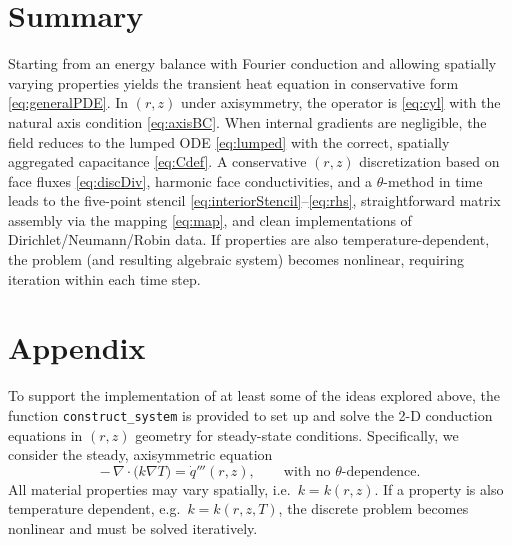 \documentclass[11pt]{article}
\begin{document}
\section{Summary}

Starting from an energy balance with Fourier conduction and allowing spatially varying properties yields the transient heat equation in conservative form \eqref{eq:generalPDE}. In $(r,z)$ under axisymmetry, the operator is \eqref{eq:cyl} with the natural axis condition \eqref{eq:axisBC}. When internal gradients are negligible, the field reduces to the lumped ODE \eqref{eq:lumped} with the correct, spatially aggregated capacitance \eqref{eq:Cdef}. A conservative $(r,z)$ discretization based on face fluxes \eqref{eq:discDiv}, harmonic face conductivities, and a $\theta$-method in time leads to the five-point stencil \eqref{eq:interiorStencil}--\eqref{eq:rhs}, straightforward matrix assembly via the mapping \eqref{eq:map}, and clean implementations of Dirichlet/Neumann/Robin data. If properties are also temperature-dependent, the problem (and resulting algebraic system) becomes nonlinear, requiring iteration within each time step.

\section*{Appendix}

To support the implementation of at least some of the ideas explored above, the function {\tt construct\_system} is provided to set up and solve the 2-D conduction equations in $(r, z)$ geometry for steady-state conditions.  
Specifically, we consider the steady, axisymmetric equation
\begin{equation}
-\,\nabla\!\cdot\!\big(k\nabla T\big)=\dot q'''(r,z),
\qquad \text{with no }\theta\text{-dependence}.
\end{equation}
All material properties may vary spatially, i.e.\ \(k=k(r,z)\). If a property is also temperature dependent, e.g.\ \(k=k(r,z,T)\), the discrete problem becomes nonlinear and must be solved iteratively.
\end{document}
